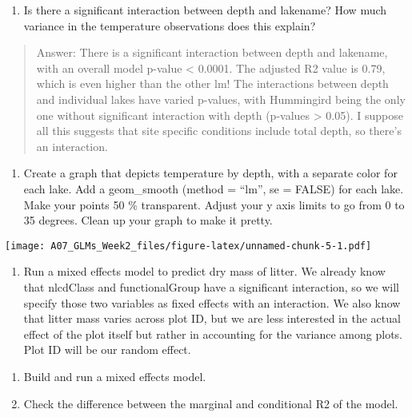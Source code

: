 \documentclass[
]{article}
\providecommand{\tightlist}{%
  \setlength{\itemsep}{0pt}\setlength{\parskip}{0pt}}
\begin{document}
\begin{enumerate}
\def\labelenumi{\arabic{enumi}.}
\setcounter{enumi}{6}
\tightlist
\item
  Is there a significant interaction between depth and lakename? How
  much variance in the temperature observations does this explain?
\end{enumerate}

\begin{quote}
Answer: There is a significant interaction between depth and lakename,
with an overall model p-value \textless{} 0.0001. The adjusted R2 value
is 0.79, which is even higher than the other lm! The interactions
between depth and individual lakes have varied p-values, with Hummingird
being the only one without significant interaction with depth (p-values
\textgreater{} 0.05). I suppose all this suggests that site specific
conditions include total depth, so there's an interaction.
\end{quote}

\begin{enumerate}
\def\labelenumi{\arabic{enumi}.}
\setcounter{enumi}{7}
\tightlist
\item
  Create a graph that depicts temperature by depth, with a separate
  color for each lake. Add a geom\_smooth (method = ``lm'', se = FALSE)
  for each lake. Make your points 50 \% transparent. Adjust your y axis
  limits to go from 0 to 35 degrees. Clean up your graph to make it
  pretty.
\end{enumerate}

\texttt{[image: A07\_GLMs\_Week2\_files/figure-latex/unnamed-chunk-5-1.pdf]}

\begin{enumerate}
\def\labelenumi{\arabic{enumi}.}
\setcounter{enumi}{8}
\tightlist
\item
  Run a mixed effects model to predict dry mass of litter. We already
  know that nlcdClass and functionalGroup have a significant
  interaction, so we will specify those two variables as fixed effects
  with an interaction. We also know that litter mass varies across plot
  ID, but we are less interested in the actual effect of the plot itself
  but rather in accounting for the variance among plots. Plot ID will be
  our random effect.
\end{enumerate}

\begin{enumerate}
\def\labelenumi{\alph{enumi}.}
\tightlist
\item
  Build and run a mixed effects model.
\item
  Check the difference between the marginal and conditional R2 of the
  model.
\end{enumerate}
\end{document}
